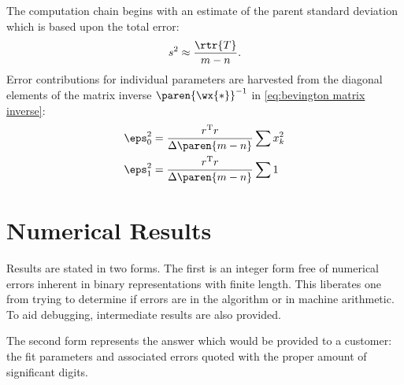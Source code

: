 The computation chain begins with an estimate of the parent standard deviation which is based upon the total error:
  \begin{equation*}
    s^{2} \approx \frac{\rtr{T}} {m-n}.
  \end{equation*}
Error contributions for individual parameters are harvested from the diagonal elements of the matrix inverse $\paren{\wx{*}}^{-1}$ in \eqref{eq:bevington matrix inverse}:
\begin{equation*}
  \begin{split}
    \eps_{0}^{2} &= \frac{r^{\mathrm{T}}r}{\Delta\paren{m-n}} \sum x_{k}^{2} \\
    \eps_{1}^{2} &= \frac{r^{\mathrm{T}}r}{\Delta\paren{m-n}} \sum 1 \\
  \end{split}
  \label{eqn:bevington error terms}
\end{equation*}
  
\section{\label{sec:numerical results}Numerical Results}  %

Results are stated in two forms. The first is an integer form free of numerical errors inherent in binary representations with finite length. This liberates one from trying to determine if errors are in the algorithm or in machine arithmetic. To aid debugging, intermediate results are also provided.

The second form represents the answer which would be provided to a customer: the fit parameters and associated errors quoted with the proper amount of significant digits.
 
